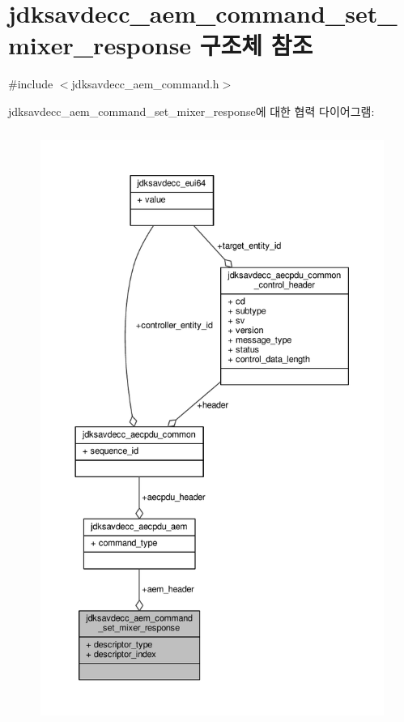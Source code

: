 \hypertarget{structjdksavdecc__aem__command__set__mixer__response}{}\section{jdksavdecc\+\_\+aem\+\_\+command\+\_\+set\+\_\+mixer\+\_\+response 구조체 참조}
\label{structjdksavdecc__aem__command__set__mixer__response}


{\ttfamily \#include $<$jdksavdecc\+\_\+aem\+\_\+command.\+h$>$}



jdksavdecc\+\_\+aem\+\_\+command\+\_\+set\+\_\+mixer\+\_\+response에 대한 협력 다이어그램\+:
\nopagebreak
\begin{figure}[H]
\begin{center}
\leavevmode
\includegraphics[height=550pt]{structjdksavdecc__aem__command__set__mixer__response__coll__graph}
\end{center}
\end{figure}
